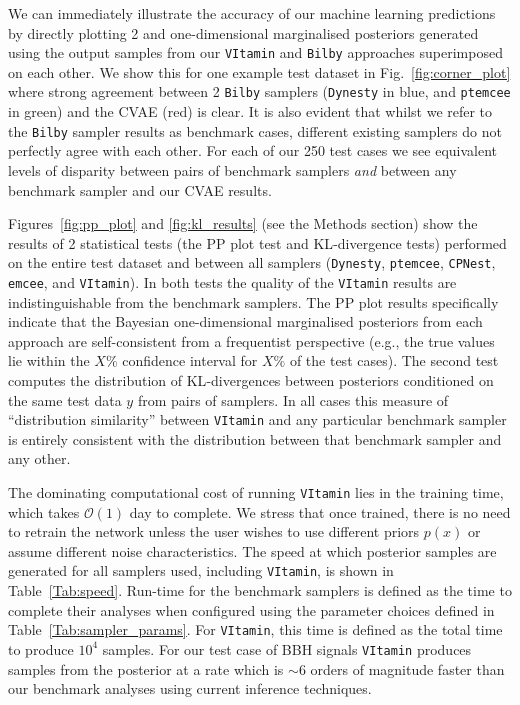 \documentclass[%
showpacs,
nofootinbib,
 amsmath,amssymb,
 aps,
 twocolumn,
 prl,
 reprint,
floatfix,
]{revtex4-1}
\begin{document}
%
%
We can immediately illustrate the accuracy of our machine learning predictions
by directly plotting 2 and one-dimensional marginalised posteriors generated
using the output samples from our \texttt{VItamin} and \texttt{Bilby}
approaches superimposed on each other. We show this for one example test
dataset in Fig.~\ref{fig:corner_plot} where strong agreement between 2
\texttt{Bilby} samplers (\texttt{Dynesty} in blue, and \texttt{ptemcee} in green) and the
\ac{CVAE} (red) is clear. It is also evident that whilst we refer to the
\texttt{Bilby} sampler results as benchmark cases, different existing samplers
do not perfectly agree with each other. For each of our 250 test cases we see
equivalent levels of disparity between pairs of benchmark samplers \emph{and}
between any benchmark sampler and our \ac{CVAE} results.  

%
%
Figures~\ref{fig:pp_plot} and \ref{fig:kl_results} (see the Methods section)
show the results of 2 statistical tests (the \ac{PP} plot test and
\ac{KL}-divergence tests) performed on the entire test dataset and between all
samplers (\texttt{Dynesty}, \texttt{ptemcee}, \texttt{CPNest}, \texttt{emcee}, and \texttt{VItamin}). In
both tests the quality of the \texttt{VItamin} results are indistinguishable from the
benchmark samplers. The \ac{PP} plot results specifically indicate that the
Bayesian one-dimensional marginalised posteriors from each approach are
self-consistent from a frequentist perspective (e.g., the true values lie
within the $X\%$ confidence interval for $X\%$ of the test cases). The second
test computes the distribution of \ac{KL}-divergences between posteriors
conditioned on the same test data $y$ from pairs of samplers. In all cases this
measure of ``distribution similarity'' between \texttt{VItamin} and any particular
benchmark sampler is entirely consistent with the distribution between that
benchmark sampler and any other.   

%
%
The dominating computational cost of running \texttt{VItamin} lies in the
training time, which takes $\mathcal{O}(1)$ day to complete. We
stress that once trained, there is no need to retrain the network unless the
user wishes to use different priors $p(x)$ or assume different noise
characteristics. The speed at which posterior samples are generated for all
samplers used, including \texttt{VItamin}, is shown in Table~\ref{Tab:speed}.
Run-time for the benchmark samplers is defined as the time to complete their
analyses when configured using the parameter choices defined in
Table~\ref{Tab:sampler_params}. For \texttt{VItamin}, this time is defined as
the total time to produce $10^4$ samples. For our test case of \ac{BBH} signals
\texttt{VItamin} produces samples from the posterior at a rate which is $\sim
6$ orders of magnitude faster than our benchmark analyses using current
inference techniques. 
\end{document}
